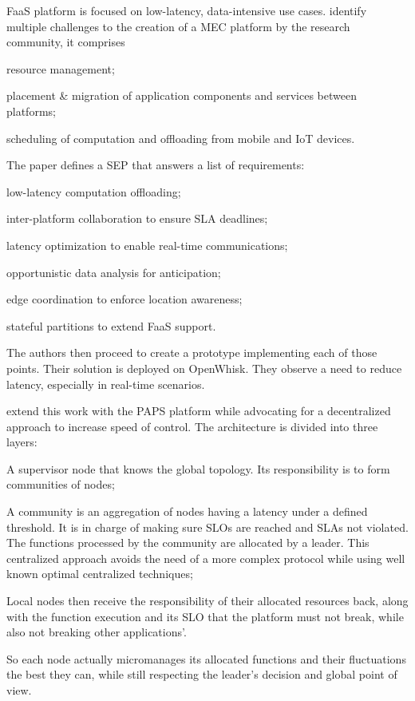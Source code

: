 \documentclass[11pt]{sdm}
\begin{document}
\begin{description}[leftmargin=10pt]
	\item[\citeposs{baresi_paps_2019}] \gls{FaaS} platform is focused on low-latency, data-intensive use cases. \cite{baresi_towards_2019} identify multiple challenges to the creation of a \gls{MEC} platform by the research community, it comprises
		\begin{enumerate*}[(i)]
			\item resource management;
			\item placement \& migration of application components and services between platforms;
			\item scheduling of computation and offloading from mobile and \gls{IoT} devices.
		\end{enumerate*}
		The paper defines a \gls{SEP} that answers a list of requirements:
		\begin{enumerate*}[(a)]
			\item low-latency computation offloading;
			\item inter-platform collaboration to ensure \gls{SLA} deadlines;
			\item latency optimization to enable real-time communications;
			\item opportunistic data analysis for anticipation;
			\item edge coordination to enforce location awareness;
			\item stateful partitions to extend \gls{FaaS} support.
		\end{enumerate*}
		The authors then proceed to create a prototype implementing each of those points. Their solution is deployed on OpenWhisk. They observe a need to reduce latency, especially in real-time scenarios.

		\citet{baresi_paps_2019, baresi_paps_2021} extend this work with the \gls{PAPS} platform while advocating for a decentralized approach to increase speed of control.
		The architecture is divided into three layers:
		\begin{enumerate*}[(1)]
			\item A supervisor node that knows the global topology. Its responsibility is to form communities of nodes;
			\item A community is an aggregation of nodes having a latency under a defined threshold. It is in charge of making sure \glspl{SLO} are reached and \glspl{SLA} not violated. The functions processed by the community are allocated by a leader. This centralized approach avoids the need of a more complex protocol while using well known optimal centralized techniques;
			\item Local nodes then receive the responsibility of their allocated resources back, along with the function execution and its \gls{SLO} that the platform must not break, while also not breaking other applications'.
		\end{enumerate*}
		So each node actually micromanages its allocated functions and their fluctuations the best they can, while still respecting the leader's decision and global point of view.


\end{description}
\end{document}
